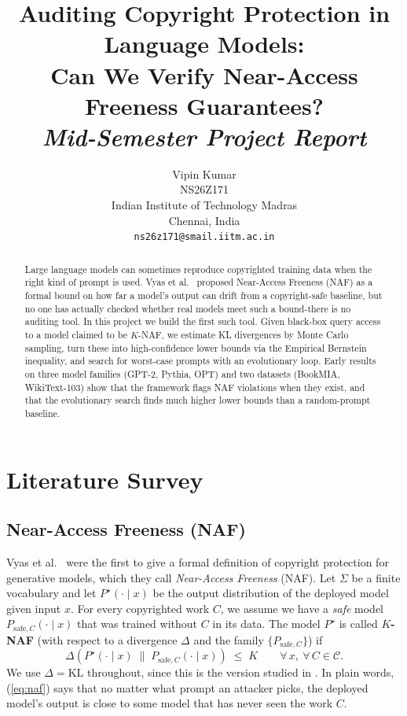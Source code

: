 \documentclass{article}
\title{Auditing Copyright Protection in Language Models:\\Can We Verify Near-Access Freeness Guarantees?\\[4pt]\normalsize \textit{Mid-Semester Project Report}}
\author{
  Vipin Kumar \\
  NS26Z171 \\
  Indian Institute of Technology Madras \\
  Chennai, India \\
  \texttt{ns26z171@smail.iitm.ac.in}
}
\begin{document}
\maketitle

\begin{abstract}
Large language models can sometimes reproduce copyrighted training data when the right kind of prompt is used. Vyas et al.\ \cite{vyas2023naf} proposed Near-Access Freeness (NAF) as a formal bound on how far a model's output can drift from a copyright-safe baseline, but no one has actually checked whether real models meet such a bound-there is no auditing tool. In this project we build the first such tool. Given black-box query access to a model claimed to be $K$-NAF, we estimate KL divergences by Monte Carlo sampling, turn these into high-confidence lower bounds via the Empirical Bernstein inequality, and search for worst-case prompts with an evolutionary loop. Early results on three model families (GPT-2, Pythia, OPT) and two datasets (BookMIA, WikiText-103) show that the framework flags NAF violations when they exist, and that the evolutionary search finds much higher lower bounds than a random-prompt baseline.
\end{abstract}

\section{Literature Survey}
\label{sec:litsurvey}

\subsection{Near-Access Freeness (NAF)}
\label{sec:naf}

Vyas et al.\ \cite{vyas2023naf} were the first to give a formal definition of copyright protection for generative models, which they call \emph{Near-Access Freeness} (NAF).
Let $\Sigma$ be a finite vocabulary and let $P^\star(\cdot \mid x)$ be the output distribution of the deployed model given input $x$. For every copyrighted work $C$, we assume we have a \emph{safe} model $P_{\mathrm{safe},C}(\cdot \mid x)$ that was trained without $C$ in its data. The model $P^\star$ is called \textbf{$K$-NAF} (with respect to a divergence $\Delta$ and the family $\{P_{\mathrm{safe},C}\}$) if
\begin{equation}
\label{eq:naf}
  \Delta\!\left(P^\star(\cdot \mid x) \;\|\; P_{\mathrm{safe},C}(\cdot \mid x)\right) \;\le\; K
  \qquad \forall\, x,\ \forall\, C \in \mathcal{C}.
\end{equation}
We use $\Delta=\mathrm{KL}$ throughout, since this is the version studied in \cite{vyas2023naf,he2026anchored}.
In plain words, (\ref{eq:naf}) says that no matter what prompt an attacker picks, the deployed model's output is close to some model that has never seen the work $C$.
\end{document}
